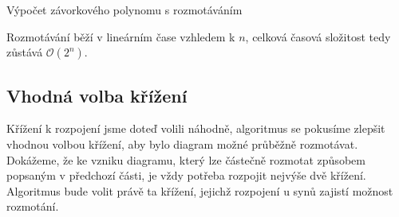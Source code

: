 \begin{algorithm}[h]
\caption{Výpočet závorkového polynomu s rozmotáváním} 
\label{alg02:03}
\DontPrintSemicolon

%





\end{algorithm}

Rozmotávání běží v lineárním čase vzhledem k $n$, celková časová složitost tedy zůstává $\mathcal{O}(2^n)$.

\subsection{Vhodná volba křížení} \label{volba}
Křížení k rozpojení jsme doteď volili náhodně, algoritmus se pokusíme zlepšit vhodnou volbou křížení, aby bylo diagram možné průběžně rozmotávat.
Dokážeme, že ke vzniku diagramu, který lze částečně rozmotat způsobem popsaným v předchozí části, je vždy potřeba rozpojit nejvýše dvě křížení.
Algoritmus bude volit právě ta křížení, jejichž rozpojení u synů zajistí možnost rozmotání.


